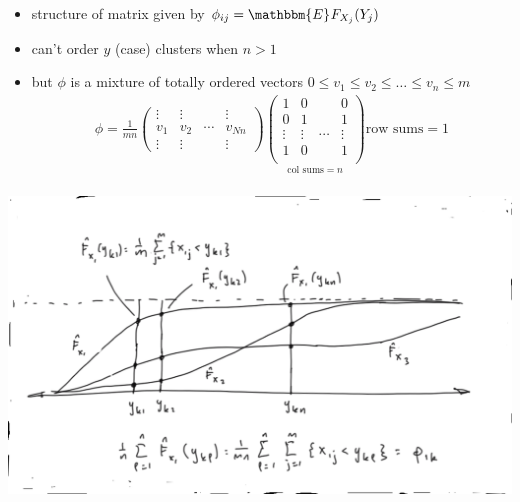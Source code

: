 \documentclass{beamer}
\newcommand{\I}{N}
\begin{document}
\begin{frame}
  \begin{itemize}
  \item  structure of matrix given by $\phi_{ij}=\mathbbm{E}_{}F_{X_j}(Y_j)$
  
  \item  can't order $y$ (case) clusters when $n>1$
  
  \item  but $\phi$ is a mixture of totally ordered vectors $0\le v_1\le v_2\le\ldots\le v_n\le m$
  \begin{align}
    \phi=\frac{1}{mn}    \begin{pmatrix}
      \vdots & \vdots & & \vdots \\
      v_1 & v_2 & \cdots & v_{\I n}\\
      \vdots & \vdots & & \vdots
    \end{pmatrix}
                          \underset{\textstyle \text{col sums}=n}{
                          \begin{pmatrix}                            
                            1 & 0 &  & 0\\
                            0 & 1 &  & 1\\
                            \vdots&\vdots & \cdots &\vdots \\
                            1 & 0 &  & 1\\
                          \end{pmatrix}}
     \text{row sums}=1\\
  \end{align}
\end{itemize}
\end{frame}
\begin{frame}
  \includegraphics[width=\textwidth]{fig13.png}
\end{frame}
\end{document}
